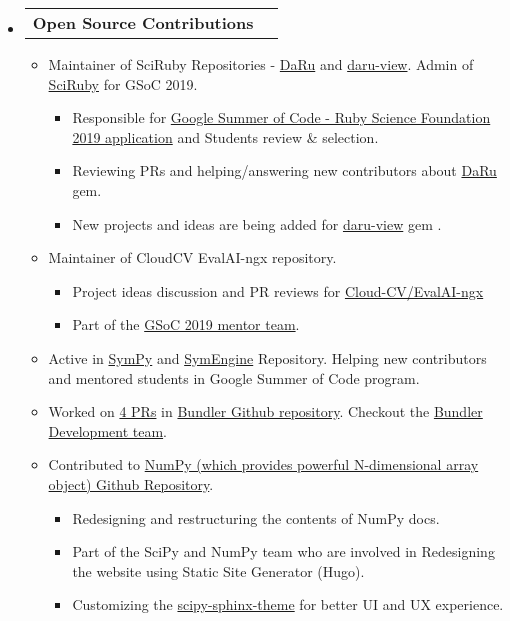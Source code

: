 \documentclass[letterpaper,12pt]{article}[leftmargin=*]
\makeatletter
\def \entryspacing {-0pt}
\newcommand{\resumeEntryStart}{\begin{itemize}[leftmargin=2.5mm]}
\newcommand{\resumeEntryEnd}{\end{itemize}\vspace{\entryspacing}}
\newcommand{\resumeItemListStart}{\begin{itemize}[leftmargin=4.5mm]}
\newcommand{\resumeItemListEnd}{\end{itemize}}
\newcommand{\resumeItem}[1]{
  \item\small{
    {#1 \vspace{-2pt}}
  }
}
\newcommand{\resumeEntryTD}[2]{
  \vspace{-1pt}\item[]
    \begin{tabular*}{0.97\textwidth}{l@{\extracolsep{\fill}}r}
      \textbf{\color{primary}#1} & {\firabook\color{accent}\small#2} \\
    \end{tabular*}\vspace{-6pt}
}
\makeatother
\begin{document}
  \resumeEntryStart
    \resumeEntryTD
      {Open Source Contributions}{}
    \resumeItemListStart
      \resumeItem {Maintainer of SciRuby Repositories - \href{https://github.com/SciRuby/daru/}{DaRu} and \href{https://github.com/SciRuby/daru-view/}{daru-view}. Admin of \href{https://github.com/SciRuby/}{SciRuby} for GSoC 2019.
        \begin{itemize}
            \item Responsible for \href{https://github.com/SciRuby/sciruby/wiki/Google-Summer-of-Code-2019-Ideas}{Google Summer of Code - Ruby Science Foundation 2019 application} and Students review & selection.

            \item Reviewing PRs and helping/answering new contributors about
            \href{https://github.com/SciRuby/daru/}{DaRu} gem.

            \item New projects and ideas are being added for \href{https://github.com/SciRuby/daru-view/}{daru-view} gem .
        \end{itemize}
      }
      \resumeItem {Maintainer of CloudCV EvalAI-ngx repository.
        \begin{itemize}
            \item Project ideas discussion and PR reviews for \href{https://github.com/Cloud-CV/EvalAI-ngx}{Cloud-CV/EvalAI-ngx}

            \item Part of the \href{https://cloudcv.org/team}{GSoC 2019 mentor team}.

        \end{itemize}
      }

      \resumeItem {Active in \href{https://github.com/sympy/sympy}{SymPy} and \href{https://github.com/symengine/symengine}{SymEngine} Repository. Helping new contributors and mentored students in Google Summer of Code program.}

      \resumeItem {Worked on \href{https://github.com/bundler/bundler/commits?author=Shekharrajak}{4 PRs} in \href{https://github.com/bundler/bundler/}{Bundler Github repository}. Checkout the \href{https://bundler.io/contributors.html}{Bundler Development team}.}

      \resumeItem {Contributed to \href{https://github.com/numpy/numpy/}{NumPy (which provides powerful N-dimensional array object) Github Repository}. }
      \begin{itemize}
            \item Redesigning and restructuring the contents of NumPy docs.
            \item Part of the SciPy and NumPy team who are involved in Redesigning the website using Static Site Generator (Hugo).
            \item Customizing the \href{https://github.com/scipy/scipy-sphinx-theme}{scipy-sphinx-theme} for better UI and UX experience.

        \end{itemize}
    \resumeItemListEnd
  \resumeEntryEnd
\end{document}
